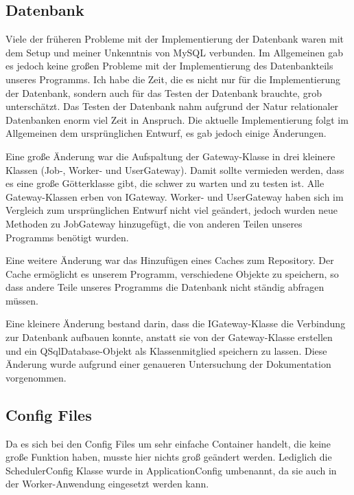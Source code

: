 \documentclass[a4paper,12pt]{article}
\begin{document}
\subsection{Datenbank}
\vspace{0.2cm}
Viele der früheren Probleme mit der Implementierung der Datenbank waren mit dem Setup und meiner Unkenntnis von MySQL verbunden. Im Allgemeinen gab es jedoch keine großen Probleme mit der Implementierung des Datenbankteils unseres Programms. Ich habe die Zeit, die es nicht nur für die Implementierung der Datenbank, sondern auch für das Testen der Datenbank brauchte, grob unterschätzt. Das Testen der Datenbank nahm aufgrund der Natur relationaler Datenbanken enorm viel Zeit in Anspruch. Die aktuelle Implementierung folgt im Allgemeinen dem ursprünglichen Entwurf, es gab jedoch einige Änderungen.\par 
\vspace{5mm}
Eine große Änderung war die Aufspaltung der Gateway-Klasse in drei kleinere Klassen (Job-, Worker- und UserGateway). Damit sollte vermieden werden, dass es eine große Götterklasse gibt, die schwer zu warten und zu testen ist. Alle Gateway-Klassen erben von IGateway. Worker- und UserGateway haben sich im Vergleich zum ursprünglichen Entwurf nicht viel geändert, jedoch wurden neue Methoden zu JobGateway hinzugefügt, die von anderen Teilen unseres Programms benötigt wurden.\par
\vspace{5mm}
Eine weitere Änderung war das Hinzufügen eines Caches zum Repository. Der Cache ermöglicht es unserem Programm, verschiedene Objekte zu speichern, so dass andere Teile unseres Programms die Datenbank nicht ständig abfragen müssen.\par
\vspace{5mm}
Eine kleinere Änderung bestand darin, dass die IGateway-Klasse die Verbindung zur Datenbank aufbauen konnte, anstatt sie von der Gateway-Klasse erstellen und ein QSqlDatabase-Objekt als Klassenmitglied speichern zu lassen. Diese Änderung wurde aufgrund einer genaueren Untersuchung der Dokumentation vorgenommen.

\subsection{Config Files}
\vspace{0.2cm}
Da es sich bei den Config Files um sehr einfache Container handelt, die keine große Funktion haben, musste hier nichts groß geändert werden. Lediglich die SchedulerConfig Klasse wurde in ApplicationConfig umbenannt, da sie auch in der Worker-Anwendung eingesetzt werden kann. 
\end{document}
